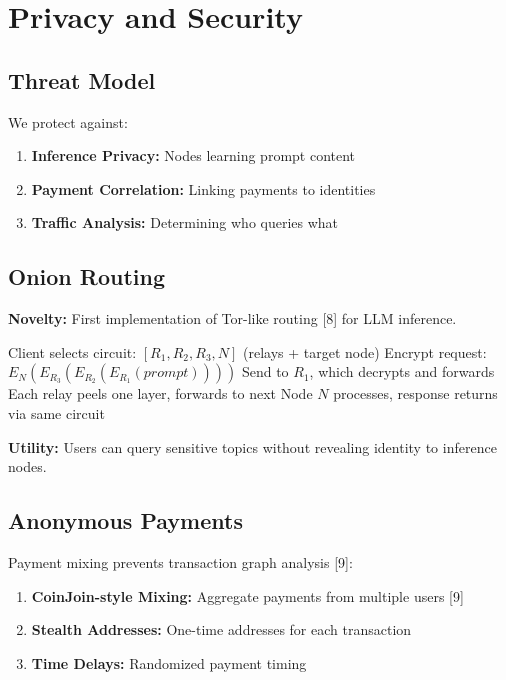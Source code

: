 \documentclass[11pt,a4paper]{article}
\begin{document}
\section{Privacy and Security}

\subsection{Threat Model}

We protect against:

\begin{enumerate}
    \item \textbf{Inference Privacy:} Nodes learning prompt content
    \item \textbf{Payment Correlation:} Linking payments to identities
    \item \textbf{Traffic Analysis:} Determining who queries what
\end{enumerate}

\subsection{Onion Routing}

\textbf{Novelty:} First implementation of Tor-like routing [8] for LLM inference.

\begin{algorithm}[H]
\caption{Onion-Routed Inference}
\begin{algorithmic}[1]
\State Client selects circuit: $[R_1, R_2, R_3, N]$ (relays + target node)
\State Encrypt request: $E_{N}(E_{R_3}(E_{R_2}(E_{R_1}(prompt))))$
\State Send to $R_1$, which decrypts and forwards
\State Each relay peels one layer, forwards to next
\State Node $N$ processes, response returns via same circuit
\end{algorithmic}
\end{algorithm}

\textbf{Utility:} Users can query sensitive topics without revealing identity to inference nodes.

\subsection{Anonymous Payments}

Payment mixing prevents transaction graph analysis [9]:

\begin{enumerate}
    \item \textbf{CoinJoin-style Mixing:} Aggregate payments from multiple users [9]
    \item \textbf{Stealth Addresses:} One-time addresses for each transaction
    \item \textbf{Time Delays:} Randomized payment timing
\end{enumerate}
\end{document}
